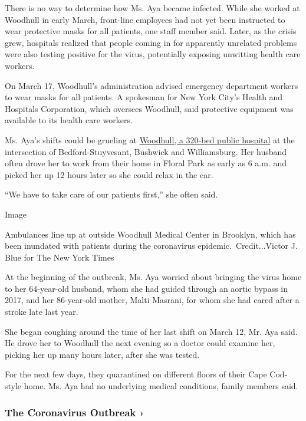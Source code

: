 There is no way to determine how Ms. Aya became infected. While she
worked at Woodhull in early March, front-line employees had not yet been
instructed to wear protective masks for all patients, one staff member
said. Later, as the crisis grew, hospitals realized that people coming
in for apparently unrelated problems were also testing positive for the
virus, potentially exposing unwitting health care workers.

On March 17, Woodhull's administration advised emergency department
workers to wear masks for all patients. A spokesman for New York City's
Health and Hospitals Corporation, which oversees Woodhull, said
protective equipment was available to its health care workers.

Ms. Aya's shifts could be grueling at
\href{https://www.nychealthandhospitals.org/woodhull/}{Woodhull, a
320-bed public hospital} at the intersection of Bedford-Stuyvesant,
Bushwick and Williamsburg. Her husband often drove her to work from
their home in Floral Park as early as 6 a.m. and picked her up 12 hours
later so she could relax in the car.

``We have to take care of our patients first,'' she often said.

Image

Ambulances line up at outside Woodhull Medical Center in Brooklyn, which
has been inundated with patients during the coronavirus
epidemic.~Credit...Victor J. Blue for The New York Times

At the beginning of the outbreak, Ms. Aya worried about bringing the
virus home to her 64-year-old husband, whom she had guided through an
aortic bypass in 2017, and her 86-year-old mother, Malti Masrani, for
whom she had cared after a stroke late last year.

She began coughing around the time of her last shift on March 12, Mr.
Aya said. He drove her to Woodhull the next evening so a doctor could
examine her, picking her up many hours later, after she was tested.

For the next few days, they quarantined on different floors of their
Cape Cod-style home. Ms. Aya had no underlying medical conditions,
family members said.

\href{https://www.nytimes3xbfgragh.onion/news-event/coronavirus?action=click\&pgtype=Article\&state=default\&region=MAIN_CONTENT_3\&context=storylines_faq}{}

\hypertarget{the-coronavirus-outbreak-}{%
\subsubsection{The Coronavirus Outbreak
›}\label{the-coronavirus-outbreak-}}

